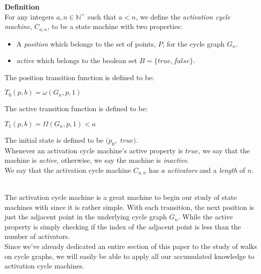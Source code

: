 \documentclass[a4paper,12pt]{article}
\begin{document}
\label{definition:activation_cycle_machine}
\hypertarget{definition:activation_cycle_machine}{}
\begin{tcolorbox}
\textbf{Definition}\\
For any integers $a, n \in \mathbb{N^+}$ such that $a < n$, we define the \textit{activation cycle machine}, $C_{a, n}$, to be a state machine with two properties:

\begin{itemize}
\item A \textit{position} which belongs to the set of points, $P$, for the cycle graph $G_n$.

\item \textit{active} which belongs to the boolean set $B = \{true, false\}$.
\end{itemize}

The position transition function is defined to be:
\begin{center}
$T_0(p, b) = \omega(G_n, p, 1)$
\end{center}

The active transition function is defined to be:
\begin{center}
$T_1(p, b) = \Omega(G_n, p, 1) < a$ 
\end{center}

The initial state is defined to be $(p_0,$ $true)$.\\

\noindent Whenever an activation cycle machine's active property is $true$, we say that the machine is \textit{active}, otherwise, we say the machine is \textit{inactive}.\\

\noindent We say that the activation cycle machine $C_{a, n}$ has $a$ \textit{activators} and a \textit{length} of $n$.

\end{tcolorbox}




\noindent \\The activation cycle machine is a great machine to begin our study of state machines with since it is rather simple. With each transition, the next position is just the adjacent point in the underlying cycle graph $G_n$. While the active property is simply checking if the index of the adjacent point is less than the number of activators.\\

\noindent Since we've already dedicated an entire section of this paper to the study of walks on cycle graphs, we will easily be able to apply all our accumulated knowledge to activation cycle machines.
\end{document}
